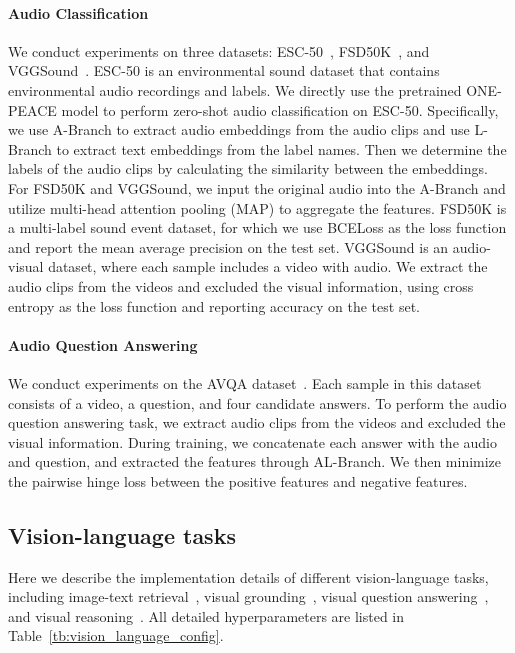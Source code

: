 \documentclass{article}
\newcommand{\onepeace}{ONE-PEACE\xspace}
\begin{document}
\paragraph{Audio Classification}
We conduct experiments on three datasets: ESC-50~\cite{esc50}, FSD50K~\cite{fsd50k}, and VGGSound~\cite{vggsound}. 
ESC-50 is an environmental sound dataset that contains  environmental audio recordings and  labels. 
We directly use the pretrained \onepeace model to perform zero-shot audio classification on ESC-50. Specifically, we use A-Branch to extract audio embeddings from the audio clips and use L-Branch to extract text embeddings from the label names. Then we determine the labels of the audio clips by calculating the similarity between the embeddings.
For FSD50K and VGGSound, we input the original audio into the A-Branch and utilize multi-head attention pooling (MAP) to aggregate the features. 
FSD50K is a multi-label sound event dataset, for which we use BCELoss as the loss function and report the mean average precision on the test set.
VGGSound is an audio-visual dataset, where each sample includes a video with audio.
We extract the audio clips from the videos and excluded the visual information, using cross entropy as the loss function and reporting accuracy on the test set.

\paragraph{Audio Question Answering}
We conduct experiments on the AVQA dataset~\cite{avqa}. 
Each sample in this dataset consists of a video, a question, and four candidate answers. 
To perform the audio question answering task, we extract audio clips from the videos and excluded the visual information. 
During training, we concatenate each answer with the audio and question, and extracted the features through AL-Branch. 
We then minimize the pairwise hinge loss between the positive features and negative features.


\subsection{Vision-language tasks}
\label{app:vision_language_details}
Here we describe the implementation details of different vision-language tasks, including image-text retrieval~\cite{flickr,mscoco}, visual grounding~\cite{refcoco,refcocog}, visual question answering~\cite{vqa}, and visual reasoning~\cite{nlvr2}.
All detailed hyperparameters are listed in Table~\ref{tb:vision_language_config}.
\end{document}
